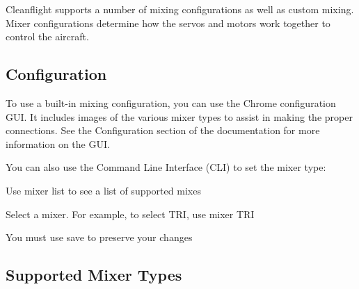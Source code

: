 Cleanflight supports a number of mixing configurations as well as custom mixing. Mixer configurations determine how the servos and motors work together to control the aircraft.

\subsection*{Configuration}

To use a built-\/in mixing configuration, you can use the Chrome configuration G\+U\+I. It includes images of the various mixer types to assist in making the proper connections. See the Configuration section of the documentation for more information on the G\+U\+I.

You can also use the Command Line Interface (C\+L\+I) to set the mixer type\+:


\begin{DoxyEnumerate}
\item Use {\ttfamily mixer list} to see a list of supported mixes
\item Select a mixer. For example, to select T\+R\+I, use {\ttfamily mixer T\+R\+I}
\item You must use {\ttfamily save} to preserve your changes
\end{DoxyEnumerate}

\subsection*{Supported Mixer Types}

